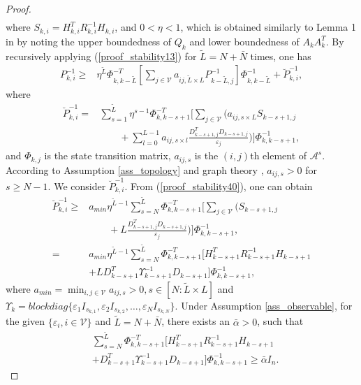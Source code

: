 \documentclass[journal,transmag]{IEEEtran}
\begin{document}
{\begin{proof}
\begin{align}
		\end{align}
		where $S_{k,i}=H_{ k,i}^TR_{k,i}^{-1}H_{ k,i}$, and
		$0< \eta<1$, which is obtained similarly to Lemma 1 in \cite{Battistelli2014Kullback} by noting the upper boundedness of   $Q_{k}$ and lower boundedness of $A_{k}A_{ k}^T$.
		By recursively applying  (\ref{proof_stability13}) for $\tilde L=N+\bar N$ times, one has
		\begin{align*}
		P_{ k,i}^{-1} 		\geq&\eta^{\tilde L}\Phi_{ k,k-\tilde L}^{-T}\left[\sum_{j\in \mathcal{V}} a_{ij,\tilde L\times L}P_{k-\tilde L,j}^{-1} \right] \Phi_{ k,k-\tilde L}^{-1}+
		\breve{P}_{ k,i}^{-1},
		\end{align*}
		where
			\begin{align}\label{proof_stability40}
			\breve{P}_{ k,i}^{-1}			=&
			\sum_{s=1}^{\tilde L}\eta^{s-1}\Phi_{ k, k-s+1}^{-T}
			\Bigg[
			\sum_{j\in \mathcal{V}} \big(a_{ij,s\times L}S_{ k-s+1,j}\\
			&\qquad+\sum_{l=0}^{L-1}a_{ij,s\times l }\frac{D_{ k-s+1,j}^TD_{ k-s+1,j}}{\varepsilon_j}
			\big)\Bigg] \Phi_{ k, k-s+1}^{-1},	\nonumber	
			\end{align}	
and $\Phi_{k,j}$ is the state transition matrix, 	$a_{ij,s}$ is the $(i,j)$th element of $\mathcal{A}^s$.
		According to  Assumption \ref{ass_topology} and graph theory \cite{horn2012matrix, varga2009matrix}, $a_{ij,s}>0$ for $s\geq N-1$.
		We consider $\breve{P}_{ k,i}^{-1}$.  From (\ref{proof_stability40}), one can obtain 
		\begin{align}\label{proof_stability4}
		\breve{P}_{ k,i}^{-1}
		\geq& a_{min}\eta^{\tilde L-1}\sum_{s=N}^{\tilde L}\Phi_{ k, k-s+1}^{-T}
		\Bigg[
		\sum_{j\in \mathcal{V}} \big(S_{ k-s+1,j}\nonumber\\
		&\qquad+L\frac{D_{ k-s+1,j}^TD_{ k-s+1,j}}{\varepsilon_j}
		\big)\Bigg] \Phi_{ k, k-s+1}^{-1},	\nonumber\\
		=& a_{min}\eta^{\tilde L-1}\sum_{s=N}^{\tilde L}\Phi_{ k, k-s+1}^{-T}
		\Bigg[H_{k-s+1}^T R_{k-s+1}^{-1}H_{k-s+1}\nonumber\\
		&+LD_{k-s+1}^T\Upsilon_{k-s+1}^{-1}D_{k-s+1}\Bigg] \Phi_{ k, k-s+1}^{-1},
		\end{align}	
		where $a_{min}=\min_{i,j\in \mathcal{V}}{a_{ij,s}>0,s\in [N:\tilde L\times L]}$ and
		$\Upsilon_{k}=blockdiag\{\varepsilon_1I_{s_{k,1}},\varepsilon_2I_{s_{k,2}},\ldots,\varepsilon_NI_{s_{k,N}}\}$.
		Under Assumption \ref{ass_observable}, for the given $\{\varepsilon_i,i\in\mathcal{V}\}$ and $\tilde L= N+\bar N$, there exists an $\bar \alpha>0$, such that
		\begin{equation*}
		\begin{split}
		&\sum_{s=N}^{\tilde L}\Phi_{ k, k-s+1}^{-T}
		\Bigg[H_{k-s+1}^T R_{k-s+1}^{-1}H_{k-s+1}\nonumber\\
		&+D_{k-s+1}^T\Upsilon_{k-s+1}^{-1}D_{k-s+1}\Bigg] \Phi_{ k, k-s+1}^{-1}\geq \bar\alpha I_{n}.
		\end{split}
		\end{equation*}
	


\end{proof}}
\end{document}
